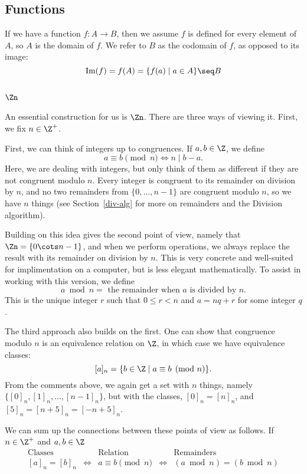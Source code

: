 \documentclass[12pt]{amsart}
\theoremstyle{plain}
\theoremstyle{definition}
\theoremstyle{remark}
\begin{document}
\subsection{Functions}
If we have a function $f:A\to B$, then we assume $f$ is defined for
every element of $A$, so $A$ is the domain of $f$.  We refer to $B$ as
the codomain of $f$, as opposed to its image:
\[ \text{Im}(f)=f(A) = \{f(a)\mid a\in A\}\seq B\]

\subsection{$\Zn$}
\label{zn}
An essential construction for us is $\Zn$.  There are three ways of
viewing it.  First, we fix $n\in\Z^+$.

First, we can think of integers up to congruences.  If $a,b\in \Z$, we
define
\[ a\equiv b\pmod n \iff n\mid b-a.\]
Here, we are dealing with integers, but only think of them as
different if they are not congruent modulo $n$.  Every integer is
congruent to its remainder on division by $n$, and no two remainders
from $\{0,\ldots, n-1\}$ are congruent modulo $n$, so we have $n$
things (see Section~\ref{div-alg} for more on remainders and the
Division algorithm).

Building on this idea gives the second point of view, namely that
$\Zn=\{0\cots n-1\}$, and when we perform operations, we always
replace the result with its remainder on division by $n$.  This is
very concrete and well-suited for implimentation on a computer, but is
less elegant mathematically.  To assist in working with this version,
we define
\[ a\bmod n = \text{ the remainder when $a$ is divided by $n$}.\]
This is the unique integer $r$ such that $0\leq r<n$ and $a=nq+r$ for
some integer $q$.

The third approach also builds on the first.  One can show that
congruence modulo $n$ is an equivalence relation on $\Z$, in which
case we have equivalence classes:
\[ [a]_n = \{b\in\Z\mid a\equiv b\pmod n\}.\]
From the comments above, we again get a set with $n$ things, namely
$\{[0]_n, [1]_n, \ldots, [n-1]_n\}$, but with the classes, $[0]_n=[n]_n$, and
$[5]_n=[n+5]_n=[-n+5]_n$.

We can sum up the connections between these points of view as
follows.  If $n\in\Z^+$ and $a,b\in \Z$
\[
\begin{array}{ccccc}
\text{Classes} && \text{Relation} && \text{Remainders} \\[1ex]
[a]_n=[b]_n & \iff & a\equiv b\pmod n & \iff & (a\bmod n) = (b \bmod n)
\end{array}
\]
\end{document}

